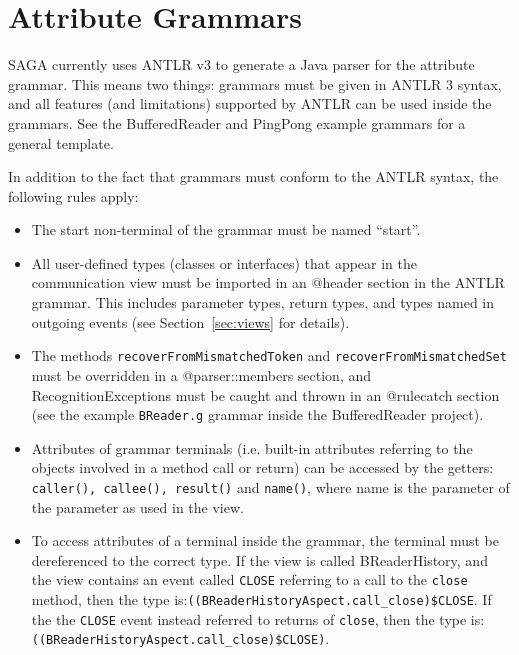 \documentclass{article}
\begin{document}
\section{Attribute Grammars}
\label{sec:grammars}
SAGA currently uses ANTLR v3 \cite{antlr.07} to generate a Java parser for the attribute grammar.  This means two things: grammars must be given in ANTLR 3 syntax,  and all features (and limitations) supported by ANTLR can be used inside the grammars.  See the BufferedReader and PingPong example grammars for a general template.

In addition to the fact that grammars must conform to the ANTLR syntax,  the following rules apply:
\begin{itemize}
\item The start non-terminal of the grammar must be named ``start''.
\item All user-defined types (classes or interfaces) that appear in the communication view must be imported in an @header section in the ANTLR grammar.  This includes parameter types, return types, and types named in outgoing events (see Section~\ref{sec:views} for details).
\item The methods \lstinline+recoverFromMismatchedToken+ and \lstinline+recoverFromMismatchedSet+ must be overridden in a @parser::members section, and RecognitionExceptions must be caught and thrown in an @rulecatch section (see the example \lstinline+BReader.g+ grammar inside the BufferedReader project).
\item Attributes of grammar terminals (i.e. built-in attributes referring to the objects involved in a method call or return) can be accessed by the getters: \lstinline+caller(), callee(), result()+ and \lstinline+name()+, where name is the parameter of the parameter as used in the view.
\item To access attributes of a terminal inside the grammar,  the terminal must be dereferenced to the correct type.  If the view is called BReaderHistory, and the view contains an event called \lstinline+CLOSE+ referring to a call to the \lstinline+close+ method, then the type is:\lstinline+((BReaderHistoryAspect.call_close)$CLOSE+. If the the \lstinline+CLOSE+ event instead referred to returns of \lstinline+close+, then the type is: \lstinline+((BReaderHistoryAspect.call_close)$CLOSE)+.
\end{itemize}
\end{document}

